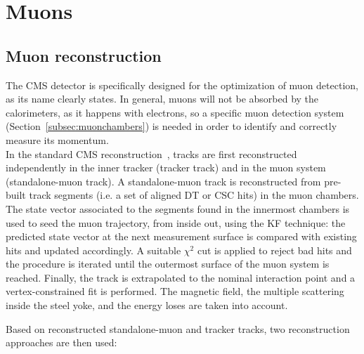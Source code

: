\section{Muons}\label{sec:muons}

\subsection{Muon reconstruction}

The CMS detector is specifically designed for the optimization of muon detection, as its name clearly states. 
In general, muons will not be absorbed by the calorimeters, as it happens with electrons, so a specific muon detection system (Section~\ref{subsec:muonchambers}) is needed in order to identify and correctly measure its momentum.\\

In the standard CMS reconstruction~\cite{Chatrchyan:2012xi}, tracks are first reconstructed independently in the inner tracker (tracker track) and in the muon system (standalone-muon track).
A standalone-muon track is reconstructed from pre-built track segments (i.e. a set of aligned DT or CSC hits) in the muon chambers. The state vector associated to the segments found in the innermost chambers is used to seed the muon trajectory, from inside out, using the KF technique: the predicted state vector at the next measurement surface is compared with existing hits and updated accordingly. A suitable $\chi^2$ cut is applied to reject bad hits and the procedure is iterated until the outermost surface of the muon system is reached. Finally, the track is extrapolated to the nominal interaction point and a vertex-constrained fit is performed. The magnetic field, the multiple scattering inside the steel yoke, and the energy loses are taken into account.

Based on reconstructed standalone-muon and tracker tracks, two reconstruction approaches are then used:

